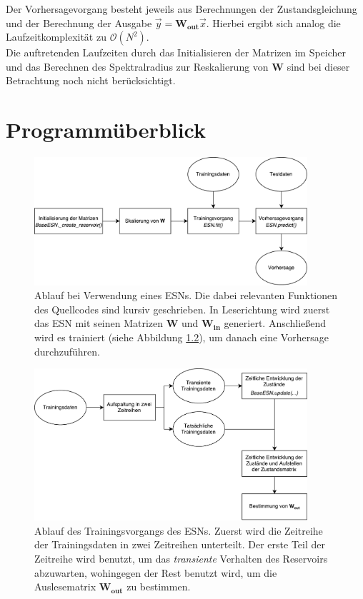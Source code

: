 \begin{appendices}
Der Vorhersagevorgang besteht jeweils aus Berechnungen der Zustandsgleichung und der  Berechnung der Ausgabe $\vec{y} = \mathbf{W_{out}} \vec{x}$. Hierbei ergibt sich analog die Laufzeitkomplexität zu $\mathcal{O}(N^2)$.\\

Die auftretenden Laufzeiten durch das Initialisieren der Matrizen im Speicher und das Berechnen des Spektralradius zur Reskalierung von $\mathbf{W}$ sind bei dieser Betrachtung noch nicht berücksichtigt.

\chapter{Programmüberblick}

\begin{figure}[h]
	\centering
	\includegraphics[width=0.9\textwidth]{figures/illustrations/esn_flow_chart.pdf}
  	\caption{Ablauf bei Verwendung eines \textsc{ESN}s. Die dabei relevanten Funktionen des Quellcodes sind kursiv geschrieben. In Leserichtung wird zuerst das \textsc{ESN} mit seinen Matrizen $\mathbf{W}$ und $\mathbf{W_{in}}$ generiert. Anschließend wird es trainiert (siehe Abbildung \ref{fig:apx_esn_training_flowchart}), um danach eine Vorhersage durchzuführen.}
  	  \label{fig:apx_esn_flowchart}
\end{figure}%

\begin{figure}[h]
	\centering
	\includegraphics[width=0.9\textwidth]{figures/illustrations/esn_training_flow_chart.pdf}
  	\caption{Ablauf des Trainingsvorgangs des \textsc{ESN}s. Zuerst wird die Zeitreihe der Trainingsdaten in zwei Zeitreihen unterteilt. Der erste Teil der Zeitreihe wird benutzt, um das \textit{transiente} Verhalten des Reservoirs abzuwarten, wohingegen der Rest benutzt wird, um die Auslesematrix $\mathbf{W_{out}}$ zu bestimmen.}
  	\label{fig:apx_esn_training_flowchart}
\end{figure}%


\end{appendices}
